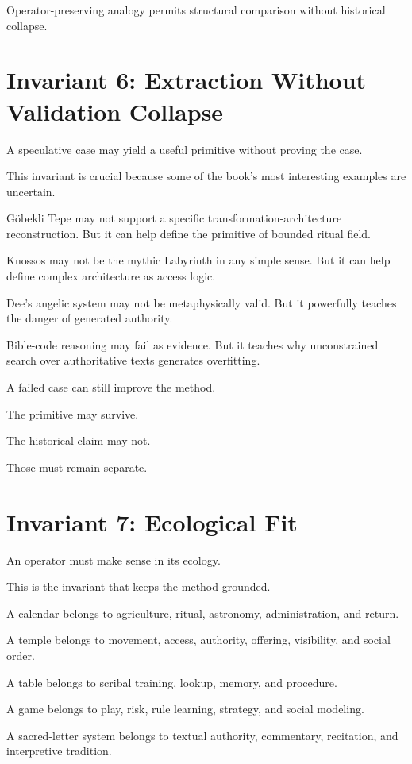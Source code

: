 \documentclass[11pt]{book}
\begin{document}
Operator-preserving analogy permits structural comparison without historical collapse.

\section{Invariant 6: Extraction Without Validation Collapse}

A speculative case may yield a useful primitive without proving the case.

This invariant is crucial because some of the book's most interesting examples are uncertain.

Göbekli Tepe may not support a specific transformation-architecture reconstruction. But it can help define the primitive of bounded ritual field.

Knossos may not be the mythic Labyrinth in any simple sense. But it can help define complex architecture as access logic.

Dee's angelic system may not be metaphysically valid. But it powerfully teaches the danger of generated authority.

Bible-code reasoning may fail as evidence. But it teaches why unconstrained search over authoritative texts generates overfitting.

A failed case can still improve the method.

The primitive may survive.

The historical claim may not.

Those must remain separate.

\section{Invariant 7: Ecological Fit}

An operator must make sense in its ecology.

This is the invariant that keeps the method grounded.

A calendar belongs to agriculture, ritual, astronomy, administration, and return.

A temple belongs to movement, access, authority, offering, visibility, and social order.

A table belongs to scribal training, lookup, memory, and procedure.

A game belongs to play, risk, rule learning, strategy, and social modeling.

A sacred-letter system belongs to textual authority, commentary, recitation, and interpretive tradition.
\end{document}
